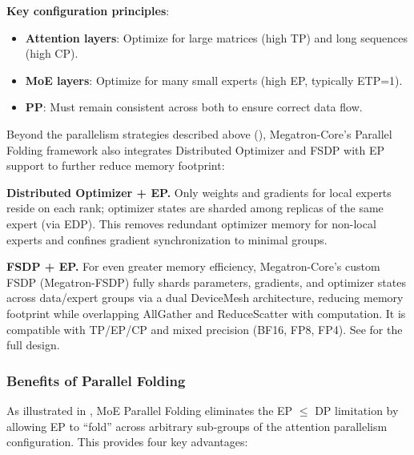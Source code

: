 \documentclass[10pt,logo,copyright]{nvidiatechreport}
\begin{document}
\textbf{Key configuration principles}:
\begin{itemize}
    \item \textbf{Attention layers}: Optimize for large matrices (high TP) and long sequences (high CP).
    \item \textbf{MoE layers}: Optimize for many small experts (high EP, typically ETP=1).
    \item \textbf{PP}: Must remain consistent across both to ensure correct data flow.
\end{itemize}

Beyond the parallelism strategies described above (), Megatron-Core's Parallel Folding framework also integrates Distributed Optimizer and FSDP with EP support to further reduce memory footprint:

\textbf{Distributed Optimizer + EP.} Only weights and gradients for local experts reside on each rank; optimizer states are sharded among replicas of the same expert (via EDP). This removes redundant optimizer memory for non-local experts and confines gradient synchronization to minimal groups.

\textbf{FSDP + EP.} For even greater memory efficiency, Megatron-Core's custom FSDP (Megatron-FSDP) fully shards parameters, gradients, and optimizer states across data/expert groups via a dual DeviceMesh architecture, reducing memory footprint while overlapping AllGather and ReduceScatter with computation. It is compatible with TP/EP/CP and mixed precision (BF16, FP8, FP4). See  for the full design.

\subsubsection{Benefits of Parallel Folding}

As illustrated in , MoE Parallel Folding eliminates the EP $\leq$ DP limitation by allowing EP to ``fold'' across arbitrary sub-groups of the attention parallelism configuration. This provides four key advantages:
\end{document}

